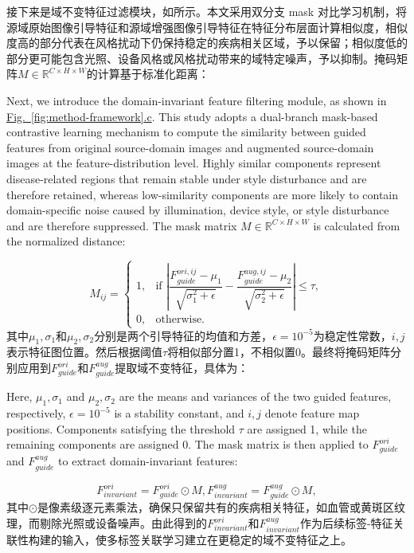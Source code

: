 接下来是域不变特征过滤模块，如所示。本文采用双分支 mask 对比学习机制，将源域原始图像引导特征和源域增强图像引导特征在特征分布层面计算相似度，相似度高的部分代表在风格扰动下仍保持稳定的疾病相关区域，予以保留；相似度低的部分更可能包含光照、设备风格或风格扰动带来的域特定噪声，予以抑制。掩码矩阵\(M \in \mathbb{R}^{C \times H \times W}\)的计算基于标准化距离：

Next, we introduce the domain-invariant feature filtering module, as shown in \hyperref[fig:method-framework]{Fig.~\ref*{fig:method-framework}.c}. This study adopts a dual-branch mask-based contrastive learning mechanism to compute the similarity between guided features from original source-domain images and augmented source-domain images at the feature-distribution level. Highly similar components represent disease-related regions that remain stable under style disturbance and are therefore retained, whereas low-similarity components are more likely to contain domain-specific noise caused by illumination, device style, or style disturbance and are therefore suppressed. The mask matrix \(M \in \mathbb{R}^{C \times H \times W}\) is calculated from the normalized distance:

\begin{equation}\label{eq:mask}
M_{ij} =
\left\{
\begin{array}{ll}
1, & \text{if } \left| \dfrac{F_{guide}^{ori,ij} - \mu_{1}}{\sqrt{\sigma_{1}^{2} + \epsilon}} - \dfrac{F_{guide}^{aug,ij} - \mu_{2}}{\sqrt{\sigma_{2}^{2} + \epsilon}} \right| \leq \tau, \\
0, & \text{otherwise.}
\end{array}
\right.
\end{equation}
其中\(\mu_{1},\sigma_{1}\)和\(\mu_{2},\sigma_{2}\)分别是两个引导特征的均值和方差，\(\epsilon = 10^{-5}\)为稳定性常数，\(i,j\)表示特征图位置。然后根据阈值\(\tau\)将相似部分置1，不相似置0。最终将掩码矩阵分别应用到\(F_{guide}^{ori}\)和\(F_{guide}^{aug}\)提取域不变特征，具体为：

Here, \(\mu_{1},\sigma_{1}\) and \(\mu_{2},\sigma_{2}\) are the means and variances of the two guided features, respectively, \(\epsilon = 10^{-5}\) is a stability constant, and \(i,j\) denote feature map positions. Components satisfying the threshold \(\tau\) are assigned 1, while the remaining components are assigned 0. The mask matrix is then applied to \(F_{guide}^{ori}\) and \(F_{guide}^{aug}\) to extract domain-invariant features:

\begin{equation}\label{eq:invariant-feature}
F_{invariant}^{ori} = F_{guide}^{ori} \odot M,F_{invariant}^{aug} = F_{guide}^{aug} \odot M,
\end{equation}
其中\(\odot\)是像素级逐元素乘法，确保只保留共有的疾病相关特征，如血管或黄斑区纹理，而剔除光照或设备噪声。由此得到的\(F_{invariant}^{ori}\)和\(F_{invariant}^{aug}\)作为后续标签-特征关联性构建的输入，使多标签关联学习建立在更稳定的域不变特征之上。

